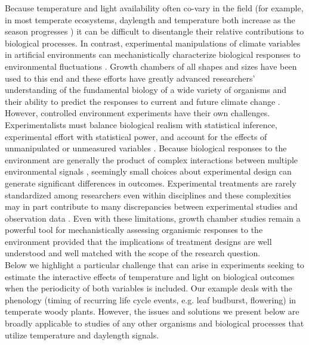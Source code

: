 \documentclass[11pt]{article}
\begin{document}
\noindent Because temperature and light availability often co-vary in the field (for example, in most temperate ecosystems, daylength and temperature both increase as the season progresses \citep{Rosenberg1974}) it can be difficult to disentangle their relative contributions to biological processes. In contrast, experimental manipulations of climate variables in artificial environments can mechanistically characterize biological responses to environmental fluctuations \citep{Ettinger:2020aa,Primack2015}. Growth chambers of all shapes and sizes have been used to this end \citep{Downs:1980us} and these efforts have greatly advanced researchers' understanding of the fundamental biology of a wide variety of organisms and their ability to predict the responses to current and future climate change \citep{Stewart:2013wz}.\\ 

However, controlled environment experiments have their own challenges. Experimentalists must balance biological realism with statistical inference, experimental effort with statistical power, and account for the effects of unmanipulated or unmeasured variables \citep{schneiner2001}. Because biological responses to the environment are generally the product of complex interactions between multiple environmental signals \citep{Casal:2002vz}, seemingly small choices about experimental design can generate significant differences in outcomes. Experimental treatments are rarely standardized among researchers even within disciplines \citep{limitingcues} and these complexities may in part contribute to many discrepancies between experimental studies and observation data \citep{Poorter:2016aa}. Even with these limitations, growth chamber studies remain a powerful tool for mechanistically assessing organismic responses to the environment provided that the implications of treatment designs are well understood and well matched with the scope of the research question. \\

Below we highlight a particular challenge that can arise in experiments seeking to estimate the interactive effects of temperature and light on biological outcomes when the periodicity of both variables is included. Our example deals with the phenology (timing of recurring life cycle events, e.g. leaf budburst, flowering) in temperate woody plants. However, the issues and solutions we present below are broadly applicable to studies of any other organisms and biological processes that utilize temperature and daylength signals. \\
\end{document}
